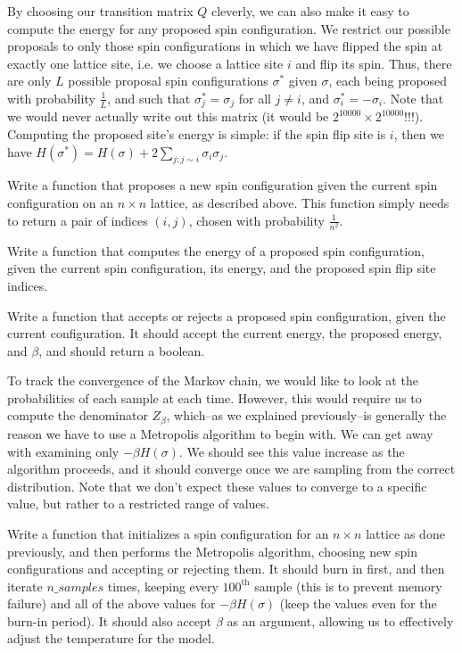 By choosing our transition matrix $Q$ cleverly, we can also make it easy to compute the energy for any proposed spin configuration. We restrict our possible proposals to only those spin configurations in which we have flipped the spin at exactly one lattice site, i.e. we choose a lattice site $i$ and flip its spin. Thus, there are only $L$ possible proposal spin configurations $\sigma^{*}$ given $\sigma$, each being proposed with probability $\frac{1}{L}$, and such that $\sigma_{j}^{*} = \sigma_{j}$ for all $j \neq i$, and $\sigma_{i}^{*} = - \sigma_{i}$. Note that we would never actually write out this matrix (it would be $2^{10000} \times 2^{10000}$!!!). Computing the proposed site's energy is simple: if the spin flip site is $i$, then we have $H(\sigma^{*}) = H(\sigma) + 2\sum_{j: j \sim i} \sigma_{i}\sigma_{j}$.

\begin{problem}
Write a function that proposes a new spin configuration given the current spin configuration on an $n \times n$ lattice, as described above. This function simply needs to return a pair of indices $(i,j)$, chosen with probability $\frac{1}{n^{2}}$.
\end{problem}

\begin{problem}
Write a function that computes the energy of a proposed spin configuration, given the current spin configuration, its energy, and the proposed spin flip site indices.
\end{problem}

\begin{problem}
Write a function that accepts or rejects a proposed spin configuration, given the current configuration. It should accept the current energy, the proposed energy, and $\beta$, and should return a boolean.
\end{problem}

To track the convergence of the Markov chain, we would like to look at the probabilities of each sample at each time. However, this would require us to compute the denominator $Z_{\beta}$, which--as we explained previously--is generally the reason we have to use a Metropolis algorithm to begin with.
We can get away with examining only $-\beta H(\sigma)$. We should see this value increase as the algorithm proceeds, and it should converge once we are sampling from the correct distribution. Note that we don't expect these values to converge
to a specific value, but rather to a restricted range of values.

\begin{problem}
Write a function that initializes a spin configuration for an $n \times n$ lattice as done previously, and then performs the Metropolis algorithm, choosing new spin configurations and accepting or rejecting them. It should burn in first, and then iterate $n\_samples$ times, keeping every $100^{\text{th}}$ sample (this is to prevent memory failure) and all of the above values for $-\beta H(\sigma)$ (keep the values even for the burn-in period). It should also accept $\beta$ as an argument, allowing us to effectively adjust the temperature for the model.
\end{problem}

